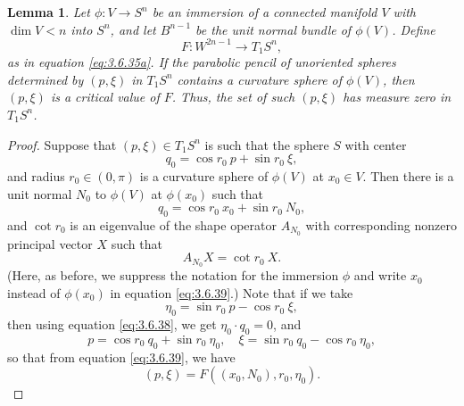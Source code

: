\documentclass[12pt]{article}
\newtheorem{lemma}{Lemma}[section]
\begin{document}
\begin{lemma}
\label{lem:3.6.4} 
Let $\phi:V \rightarrow S^n$ be an immersion of a connected manifold $V$ 
with $\dim V < n$ into $S^n$, and let $B^{n-1}$ be the
unit normal 
bundle of $\phi (V)$.  Define 
\begin{displaymath}
F: W^{2n-1} \rightarrow T_1S^n,
\end{displaymath}
as in equation \eqref{eq:3.6.35a}.  If the parabolic pencil of unoriented spheres determined by
$(p,\xi)$ in $T_1S^n$ contains a curvature sphere of $\phi (V)$, then $(p,\xi)$ is a critical value of $F$.
Thus, the set of such $(p,\xi)$ has measure zero in $T_1S^n$.
\end{lemma}
\begin{proof}
Suppose that $(p,\xi) \in T_1S^n$ is such that the sphere $S$ with center
\begin{equation}
\label{eq:3.6.38}
q_0 = \cos r_0\  p + \sin r_0\  \xi,
\end{equation}
and radius $r_0 \in (0,\pi)$ is a curvature sphere of $\phi (V)$ at $x_0 \in V$.  Then there is a unit normal
$N_0$ to $\phi (V)$ at $\phi (x_0)$ such that
\begin{equation}
\label{eq:3.6.39}
q_0 = \cos r_0\  x_0 + \sin r_0\  N_0,
\end{equation}
and $\cot r_0$ is an eigenvalue of the shape operator $A_{N_0}$ with corresponding nonzero principal vector $X$
such that
\begin{equation}
\label{eq:3.6.40}
A_{N_0} X = \cot r_0 \ X.
\end{equation}
(Here, as before, we suppress the notation for the immersion $\phi$ and write $x_0$ instead of
$\phi(x_0)$ in equation \eqref{eq:3.6.39}.)
Note that if we take
\begin{displaymath}
\eta_0 = \sin r_0\  p - \cos r_0\  \xi,
\end{displaymath}
then using equation \eqref{eq:3.6.38}, we get $\eta_0 \cdot q_0 = 0$, and
\begin{displaymath}
p = \cos r_0\  q_0 + \sin r_0\  \eta_0, \quad \xi = \sin r_0\  q_0 - \cos r_0\  \eta_0,
\end{displaymath}
so that from equation \eqref{eq:3.6.39}, we have
\begin{displaymath}
(p, \xi) = F ((x_0,N_0), r_0, \eta_0).
\end{displaymath}


\end{proof}
\end{document}
